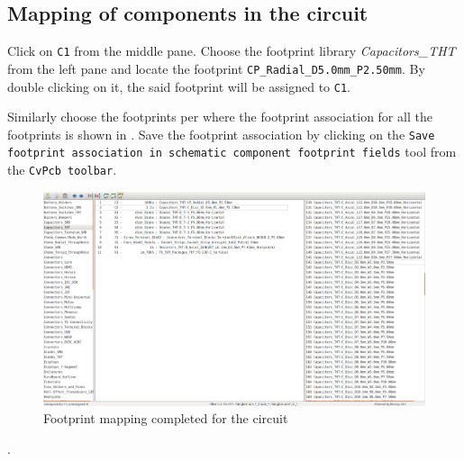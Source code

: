 \subsection{Mapping of components in the circuit}
\begin{itemsize}
\begin{compactenum}

\item Click on {\tt C1} from the middle pane. Choose the footprint  library \textit{Capacitors\_THT}
from the left pane and locate the footprint \texttt{CP\_Radial\_D5.0mm\_P2.50mm}. By double clicking on it, the said footprint will be assigned to {\tt C1}.
\item Similarly choose the footprints per  where the footprint association for all the footprints is shown in . Save the footprint association by clicking on the
\texttt{Save footprint association in schematic component footprint fields} tool from the {\tt CvPcb toolbar}. 
\end{compactenum}
\end{itemsize}

\begin{figure}
\centering
\includegraphics[width=0.85\linewidth]{manual_images/map.png}
\caption{Footprint mapping completed for the circuit}
\label{map}
\end{figure}.

